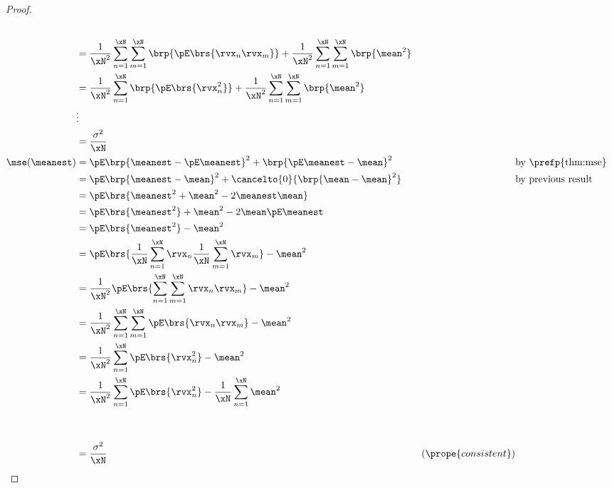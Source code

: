 \begin{proof}
\begin{align*}
  \\&= \frac{1}{\xN^2}\sum_{n=1}^{\xN}\sum_{m=1}^{\xN}\brp{\pE\brs{\rvx_n\rvx_m}}
     + \frac{1}{\xN^2}\sum_{n=1}^{\xN}\sum_{m=1}^{\xN}\brp{\mean^2}
  \\&= \frac{1}{\xN^2}\sum_{n=1}^{\xN}\brp{\pE\brs{\rvx_n^2}}
     + \frac{1}{\xN^2}\sum_{n=1}^{\xN}\sum_{m=1}^{\xN}\brp{\mean^2}
  \\&\vdots
  \\&= \frac{\sigma^2}{\xN}
  \\
  \mse(\meanest) 
    &= \pE\brp{\meanest-\pE\meanest}^2
        +\brp{\pE\meanest-\mean}^2
    && \text{by \prefp{thm:mse}}
  \\&= \pE\brp{\meanest-\mean}^2
        +\cancelto{0}{\brp{\mean-\mean}^2}
    && \text{by previous result}
  \\&= \pE\brs{\meanest^2+\mean^2 -2\meanest\mean}
  \\&= \pE\brs{\meanest^2}+\mean^2 -2\mean\pE\meanest
  \\&= \pE\brs{\meanest^2} - \mean^2
  \\&= \pE\brs{\frac{1}{\xN}\sum_{n=1}^{\xN}\rvx_n \frac{1}{\xN}\sum_{m=1}^{\xN}\rvx_m } - \mean^2
  \\&= \frac{1}{\xN^2}\pE\brs{\sum_{n=1}^{\xN}\sum_{m=1}^{\xN}\rvx_n \rvx_m } - \mean^2
  \\&= \frac{1}{\xN^2}\sum_{n=1}^{\xN}\sum_{m=1}^{\xN}\pE\brs{\rvx_n \rvx_m } - \mean^2
  \\&= \frac{1}{\xN^2}\sum_{n=1}^{\xN}\pE\brs{\rvx_n^2} - \mean^2
  \\&= \frac{1}{\xN^2}\sum_{n=1}^{\xN}\pE\brs{\rvx_n^2} - \frac{1}{\xN}\sum_{n=1}^{\xN}\mean^2
  \\
  \\
  \\&= \frac{\sigma^2}{\xN} & (\prope{consistent})
\end{align*}
\end{proof}

